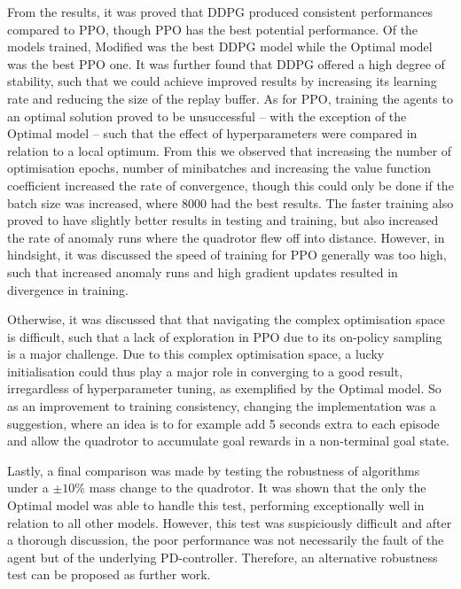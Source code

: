 From the results, it was proved that DDPG produced consistent performances compared to PPO, though PPO has the best potential performance. Of the models trained, Modified was the best DDPG model while the Optimal model was the best PPO one.
It was further found that DDPG offered a high degree of stability, such that we could achieve improved results by increasing its learning rate and reducing the size of the replay buffer. 
As for PPO, training the agents to an optimal solution proved to be unsuccessful -- with the exception of the Optimal model -- such that the effect of hyperparameters were compared in relation to a local optimum. 
From this we observed that increasing the number of optimisation epochs, number of minibatches and increasing the value function coefficient increased the rate of convergence, though this could only be done if the batch size was increased, where 8000 had the best results. The faster training also proved to have slightly better results in testing and training, but also increased the rate of anomaly runs where the quadrotor flew off into distance. However, in hindsight, it was discussed the speed of training for PPO generally was too high, such that increased anomaly runs and high gradient updates resulted in divergence in training. 

Otherwise, it was discussed that that navigating the complex optimisation space is difficult, such that a lack of exploration in PPO due to its on-policy sampling is a major challenge. Due to this complex optimisation space, a lucky initialisation could thus play a major role in converging to a good result, irregardless of hyperparameter tuning, as exemplified by the Optimal model. So as an improvement to training consistency, changing the implementation was a suggestion, where an idea is to for example add 5 seconds extra to each episode and allow the quadrotor to accumulate goal rewards in a non-terminal goal state.

Lastly, a final comparison was made by testing the robustness of algorithms under a $\pm10\%$ mass change to the quadrotor. It was shown that the only the Optimal model was able to handle this test, performing exceptionally well in relation to all other models. However, this test was suspiciously difficult and after a thorough discussion, the poor performance was not necessarily the fault of the agent but of the underlying PD-controller. Therefore, an alternative robustness test can be proposed as further work.



